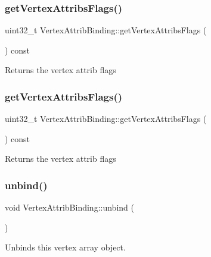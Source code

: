 \subsubsection{\texorpdfstring{get\+Vertex\+Attribs\+Flags()}{getVertexAttribsFlags()}\hspace{0.1cm}{\footnotesize\ttfamily [1/2]}}
{\footnotesize\ttfamily uint32\+\_\+t Vertex\+Attrib\+Binding\+::get\+Vertex\+Attribs\+Flags (\begin{DoxyParamCaption}{ }\end{DoxyParamCaption}) const}

Returns the vertex attrib flags \mbox{\label{classVertexAttribBinding_a686c067940b41b7db64d5103dc624799}} 
\subsubsection{\texorpdfstring{get\+Vertex\+Attribs\+Flags()}{getVertexAttribsFlags()}\hspace{0.1cm}{\footnotesize\ttfamily [2/2]}}
{\footnotesize\ttfamily uint32\+\_\+t Vertex\+Attrib\+Binding\+::get\+Vertex\+Attribs\+Flags (\begin{DoxyParamCaption}{ }\end{DoxyParamCaption}) const}

Returns the vertex attrib flags \mbox{\label{classVertexAttribBinding_ab1b0ab9b2c5719b0558c460f266b9109}} 
\subsubsection{\texorpdfstring{unbind()}{unbind()}\hspace{0.1cm}{\footnotesize\ttfamily [1/2]}}
{\footnotesize\ttfamily void Vertex\+Attrib\+Binding\+::unbind (\begin{DoxyParamCaption}{ }\end{DoxyParamCaption})}

Unbinds this vertex array object. \mbox{\label{classVertexAttribBinding_ab1b0ab9b2c5719b0558c460f266b9109}} 
